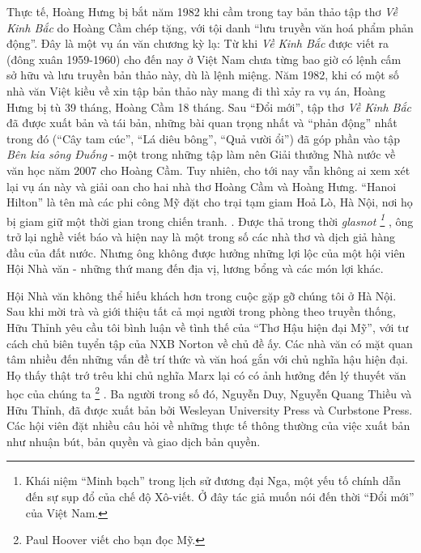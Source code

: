 \documentclass[../main.tex]{subfiles}
\begin{document}
\begin{multicols}{2}
{Thực tế, Hoàng Hưng bị bắt năm 1982 khi cầm trong tay bản thảo tập thơ \textit{Về Kinh Bắc} do Hoàng Cầm chép tặng, với tội danh “lưu truyền văn hoá phẩm phản động”. Đây là một vụ án văn chương kỳ lạ: Từ khi \textit{Về Kinh Bắc} được viết ra (đông xuân 1959-1960) cho đến nay ở Việt Nam chưa từng bao giờ có lệnh cấm sở hữu và lưu truyền bản thảo này, dù là lệnh miệng. Năm 1982, khi có một số nhà văn Việt kiều về xin tập bản thảo này mang đi thì xảy ra vụ án, Hoàng Hưng bị tù 39 tháng, Hoàng Cầm 18 tháng. Sau “Đổi mới”, tập thơ \textit{Về Kinh Bắc} đã được xuất bản và tái bản, những bài quan trọng nhất và “phản động” nhất trong đó (“Cây tam cúc”, “Lá diêu bông”, “Quả vười ổi”) đã góp phần vào tập \textit{Bên kia sông Đuống} - một trong những tập làm nên Giải thưởng Nhà nước về văn học năm 2007 cho Hoàng Cầm. Tuy nhiên, cho tới nay vẫn không ai xem xét lại vụ án này và giải oan cho hai nhà thơ Hoàng Cầm và Hoàng Hưng. “Hanoi Hilton” là tên mà các phi công Mỹ đặt cho trại tạm giam Hoả Lò, Hà Nội, nơi họ bị giam giữ một thời gian trong chiến tranh.} . Được thả trong thời \textit{glasnot \footnote{
Khái niệm “Minh bạch” trong lịch sử đương đại Nga, một yếu tố chính dẫn đến sự sụp đổ của chế độ Xô-viết. Ở đây tác giả muốn nói đến thời “Đổi mới” của Việt Nam.} }, ông trở lại nghề viết báo và  hiện nay là một trong số các nhà thơ và dịch giả hàng đầu của đất nước. Nhưng ông không được hưởng những lợi lộc của một hội viên Hội Nhà văn - những thứ mang đến địa vị, lương bổng và các món lợi khác. 
 
Hội Nhà văn không thể hiếu khách hơn trong cuộc gặp gỡ chúng tôi ở Hà Nội. Sau khi mời trà và giới thiệu tất cả mọi người trong phòng theo truyền thống, Hữu Thỉnh yêu cầu tôi bình luận về tình thế của “Thơ Hậu hiện đại Mỹ”, với tư cách chủ biên tuyển tập của NXB Norton về chủ đề ấy. Các nhà văn có mặt quan tâm nhiều đến những vấn đề trí thức và văn hoá gắn với chủ nghĩa hậu hiện đại. Họ thấy thật trớ trêu khi chủ nghĩa Marx lại có có ảnh hưởng đến lý thuyết văn học của chúng ta \footnote{
Paul Hoover viết cho bạn đọc Mỹ.} . Ba người trong số đó, Nguyễn Duy, Nguyễn Quang Thiều và Hữu Thỉnh, đã được xuất bản bởi Wesleyan University Press và Curbstone Press. Các hội viên đặt nhiều câu hỏi về những thực tế thông thường của việc xuất bản như nhuận bút, bản quyền và giao dịch bản quyền. 
 

\end{multicols}
\end{document}
